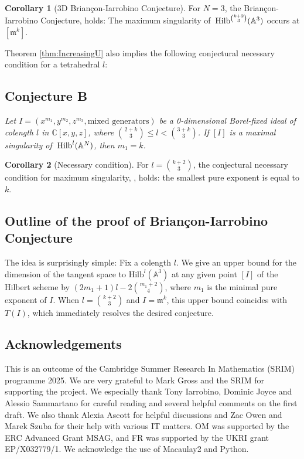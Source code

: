 \documentclass[11pt,a4paper,leqno,noamsfonts]{amsart}
\numberwithin{equation}{section}
\newcommand{\BA}{{\mathbb{A}}}
\newcommand{\BC}{{\mathbb{C}}}
\newcommand{\Fm}{{\mathfrak{m}}}
\theoremstyle{definition}
\theoremstyle{thm}
\newtheorem{cor}{Corollary}
\theoremstyle{ex}
\theoremstyle{sol}
\begin{document}
\begin{cor}[3D Brian\c{c}on-Iarrobino Conjecture]\label{Cor:BIConj} For $N=3$, the Brian\c{c}on-Iarrobino Conjecture, \cite[Section III]{Bri-Iar} holds: The maximum singularity of  $\text{\:}\mathrm{Hilb}^{{k+2\choose 3}}(\BA^3)$ occurs at $[\mathfrak{m}^k]$.
\end{cor}
\setcounter{conj}{2}

Theorem \ref{thm:IncreasingU} also implies the following conjectural necessary condition for a tetrahedral $l$:
\subsection*{Conjecture B \cite[Conjecture B for $N=3$]{Rezaee-23-Conjectures}}\label{necessaryCondition} \textit{Let $I=(x^{m_1},y^{m_2}, z^{m_3},\text{mixed generators})$ be a 0-dimensional Borel-fixed ideal of colength $l$ in $\BC[x,y,z]$, where ${2+k \choose 3}\leq l<{3+k\choose 3}$. If $[I]$ is a maximal singularity of $\text{\:}\mathrm{Hilb}^{l}(\BA^N)$, then $m_1=k$.}

\begin{cor}[Necessary condition]\label{Cor:ConjB}
For $l={k+2 \choose 3}$, the conjectural necessary condition for maximum singularity, \cite[Conjecture B]{Rezaee-23-Conjectures}, holds: the smallest pure exponent is equal to $k$.
\end{cor}







    
\subsection{Outline of the proof of Brian\c{c}on-Iarrobino Conjecture} The idea is surprisingly simple: Fix a colength $l$. We give an upper bound for the dimension of the tangent space to $\mathrm{Hilb}^l(\BA^3)$ at any given point $[I]$ of the Hilbert scheme by $(2m_1+1)l-2{m_1+2 \choose 4}$, where $m_1$ is the minimal pure exponent of $I$. When $l={k+2 \choose 3}$ and $I=\Fm^k$, this upper bound coincides with $T(I)$, which immediately resolves the desired conjecture.






\subsection*{Acknowledgements} This is an outcome of the Cambridge Summer Research In Mathematics (SRIM) programme 2025.  We are very grateful to Mark Gross and the SRIM for supporting the project. We especially thank Tony Iarrobino, Dominic Joyce and Alessio Sammartano for careful reading and several helpful comments on the first draft. We also thank Alexia Ascott for helpful discussions and Zac Owen and Marek Szuba for their help with various IT matters. OM was supported by the ERC Advanced Grant MSAG, and FR was supported by the UKRI grant EP/X032779/1. We acknowledge the use of Macaulay2 \cite{M2} and Python.
\end{document}
